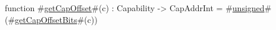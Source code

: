 function #\hyperref[sailRISCVzgetCapOffset]{getCapOffset}#(c) : Capability -> CapAddrInt =
    #\hyperref[sailRISCVzunsigned]{unsigned}#(#\hyperref[sailRISCVzgetCapOffsetBits]{getCapOffsetBits}#(c))
